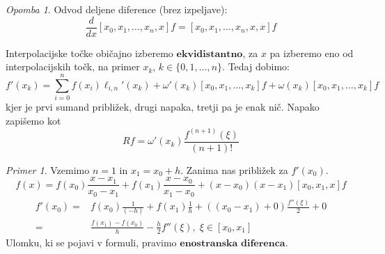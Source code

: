 \documentclass[a4paper,12pt]{article}
\theoremstyle{definition}
\theoremstyle{remark}
\newtheorem*{ex}{Primer}
\newtheorem*{rem}{Opomba}
\begin{document}
\begin{rem}
    Odvod deljene diference (brez izpeljave):
    \begin{equation*}
        \frac{d}{dx} [x_0, x_1, \dots, x_n, x] f = [x_0, x_1, \dots, x_n, x, x] f
    \end{equation*}
\end{rem}

Interpolacijske točke običajno izberemo $\textbf{ekvidistantno}$, za $x$ pa izberemo eno od interpolacijskih točk, na primer 
$x_k$, $k \in \{0, 1, \dots, n\}$. Tedaj dobimo:
\begin{equation*}
    f'(x_k) = \sum_{i=0}^{n}f(x_i) \ell_{i, n}'(x_k) + \omega'(x_k) [x_0, x_1, \dots, x_k] f + \omega(x_k) [x_0, x_1, \dots, x_k] f
\end{equation*}
kjer je prvi sumand približek, drugi napaka, tretji pa je enak nič. Napako zapišemo kot
\begin{equation*}
    Rf = \omega'(x_k) \frac{f^{(n+1)}(\xi)}{(n+1)!}
\end{equation*}

\begin{ex}
    Vzemimo $n=1$ in $x_1 = x_0 + h$. Zanima nas približek za $f'(x_0)$.
    \begin{equation*}
        f(x) = f(x_0) \frac{x-x_1}{x_0-x_1} + f(x_1) \frac{x-x_0}{x_1-x_0} + (x-x_0)(x-x_1)[x_0, x_1, x]f
    \end{equation*}
    \begin{align*}
        f'(x_0) =& f(x_0) \frac{1}{(-h)} + f(x_1) \frac{1}{h} + ((x_0 - x_1)+0)\frac{f''(\xi)}{2} + 0 \\
                =& \frac{f(x_1)-f(x_0)}{h} - \frac{h}{2} f''(\xi), \; \xi \in [x_0, x_1]
    \end{align*}
    Ulomku, ki se pojavi v formuli, pravimo $\textbf{enostranska diferenca}$.
\end{ex}
\end{document}
